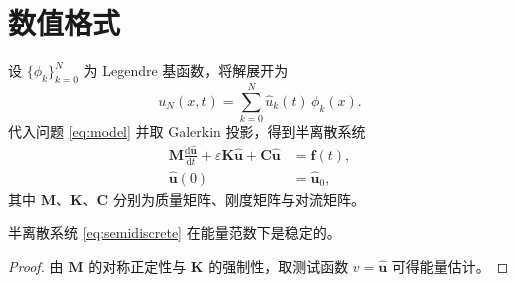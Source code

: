 \section{数值格式}
\label{sec:method}

设 $\{\phi_k\}_{k=0}^{N}$ 为 Legendre 基函数，将解展开为
\[
  u_N(x,t) = \sum_{k=0}^{N} \hat{u}_k(t)\,\phi_k(x).
\]
代入问题 \eqref{eq:model} 并取 Galerkin 投影，得到半离散系统
\begin{align}
  \mathbf{M}\frac{\mathrm{d}\hat{\mathbf{u}}}{\mathrm{d}t} + \varepsilon \mathbf{K}\hat{\mathbf{u}} + \mathbf{C}\hat{\mathbf{u}} &= \mathbf{f}(t), \label{eq:semidiscrete}\\
  \hat{\mathbf{u}}(0) &= \hat{\mathbf{u}}_0, \label{eq:ic}
\end{align}
其中 $\mathbf{M}$、$\mathbf{K}$、$\mathbf{C}$ 分别为质量矩阵、刚度矩阵与对流矩阵。

\begin{proposition}
\label{prop:stable}
半离散系统 \eqref{eq:semidiscrete} 在能量范数下是稳定的。
\end{proposition}

\begin{proof}
由 $\mathbf{M}$ 的对称正定性与 $\mathbf{K}$ 的强制性，取测试函数 $v=\hat{\mathbf{u}}$ 可得能量估计。
\end{proof}
